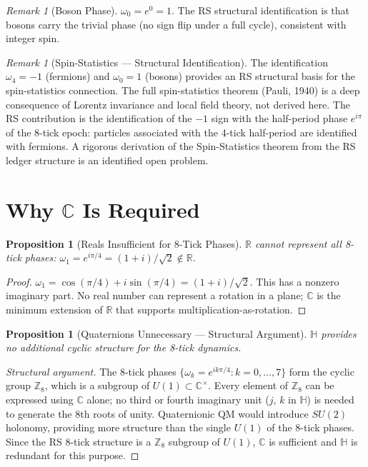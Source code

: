 \documentclass[12pt,a4paper]{article}
\newtheorem{proposition}[theorem]{Proposition}
\theoremstyle{definition}
\theoremstyle{remark}
\newtheorem{remark}[theorem]{Remark}
\begin{document}
\begin{remark}[Boson Phase]
$\omega_0 = e^{0} = 1$.  The RS structural identification is that
bosons carry the trivial phase (no sign flip under a full cycle),
consistent with integer spin.
\end{remark}

\begin{remark}[Spin-Statistics --- Structural Identification]
The identification $\omega_4 = -1$ (fermions) and $\omega_0 = 1$
(bosons) provides an RS structural basis for the spin-statistics
connection.  The full spin-statistics theorem (Pauli, 1940) is a deep
consequence of Lorentz invariance and local field theory, not derived
here.  The RS contribution is the identification of the $-1$ sign with
the half-period phase $e^{i\pi}$ of the 8-tick epoch: particles
associated with the 4-tick half-period are identified with fermions.
A rigorous derivation of the Spin-Statistics theorem from the RS
ledger structure is an identified open problem.
\end{remark}

\section{Why $\mathbb{C}$ Is Required}

\begin{proposition}[Reals Insufficient for 8-Tick Phases]
$\mathbb{R}$ cannot represent all 8-tick phases: $\omega_1 = e^{i\pi/4}
= (1+i)/\sqrt{2} \notin \mathbb{R}$.
\end{proposition}

\begin{proof}
$\omega_1 = \cos(\pi/4) + i\sin(\pi/4) = (1 + i)/\sqrt{2}$.  This
has a nonzero imaginary part.  No real number can represent a rotation
in a plane; $\mathbb{C}$ is the minimum extension of $\mathbb{R}$
that supports multiplication-as-rotation.
\end{proof}

\begin{proposition}[Quaternions Unnecessary --- Structural Argument]
$\mathbb{H}$ provides no additional cyclic structure for the 8-tick dynamics.
\end{proposition}

\begin{proof}[Structural argument]
The 8-tick phases $\{\omega_k = e^{ik\pi/4} : k = 0,\ldots,7\}$ form
the cyclic group $\mathbb{Z}_8$, which is a subgroup of $U(1)
\subset \mathbb{C}^\times$.  Every element of $\mathbb{Z}_8$ can be
expressed using $\mathbb{C}$ alone; no third or fourth imaginary unit
($j$, $k$ in $\mathbb{H}$) is needed to generate the 8th roots of
unity.  Quaternionic QM would introduce $SU(2)$ holonomy, providing
more structure than the single $U(1)$ of the 8-tick phases.  Since the
RS 8-tick structure is a $\mathbb{Z}_8$ subgroup of $U(1)$, $\mathbb{C}$
is sufficient and $\mathbb{H}$ is redundant for this purpose.
\end{proof}
\end{document}
